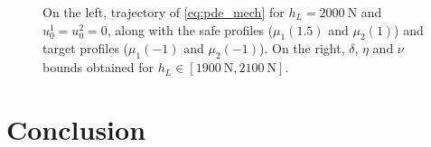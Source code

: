 \documentclass[letterpaper, 10 pt, conference]{ieeeconf/ieeeconf}
\begin{document}

\begin{figure}[!t]
    \centering 
        \hfill
        \hfill
        \caption{On the left, trajectory of \cref{eq:pde_mech} for $h_L =
            \SI{2000}{\newton}$ and $u_0^1 = u_0^2 = 0$, along with the safe
            profiles ($\mu_1(1.5)$ and $\mu_2(1)$) and target profiles
            ($\mu_1(-1)$ and $\mu_2(-1)$).
            On the right, $\delta$, $\eta$ and $\nu$ bounds obtained for $h_L
            \in [\SI{1900}{\newton}, \SI{2100}{\newton}]$.}
    \label{fig:mech_evolution}
\end{figure}


\section{Conclusion}
\label{sec:conclusion}
\end{document}

